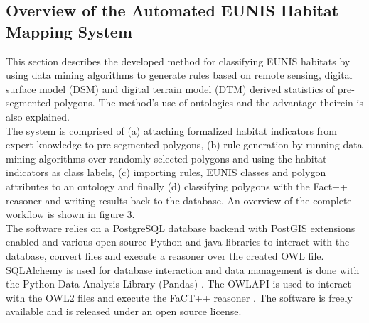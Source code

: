\documentclass[authoryear, review,12pt,number]{elsarticle}
\begin{document}
\subsection{Overview of the Automated EUNIS Habitat Mapping System}
This section describes the developed method for classifying
EUNIS habitats by using data mining algorithms to generate rules based on
remote sensing, digital surface model (DSM) and digital terrain model
(DTM) derived statistics of pre-segmented polygons. The method's use of
ontologies and the advantage theirein is also explained.\\
The system is comprised of (a) attaching formalized habitat indicators from
expert knowledge to pre-segmented polygons, (b) rule generation by running data
mining algorithms over randomly selected polygons and using the habitat
indicators as class labels, (c) importing rules, EUNIS classes and polygon
attributes to an ontology and finally (d) classifying polygons with the Fact++
reasoner \citep{Tsarkov2006} and writing results back to the database. An
overview of the complete workflow is shown in figure 3.\\
The software relies on a PostgreSQL database backend with PostGIS extensions
enabled and various open source Python and java libraries to interact with the
database, convert files and execute a reasoner over the created OWL file. 
SQLAlchemy is used for database interaction and data management is done with
the Python Data Analysis Library (Pandas) \citep{McKinney2010}. The OWLAPI is
used to interact with the OWL2 files and execute the FaCT++ reasoner
\citep{Tsarkov2006}. The software is freely available and is released under an
open source license.
\end{document}
